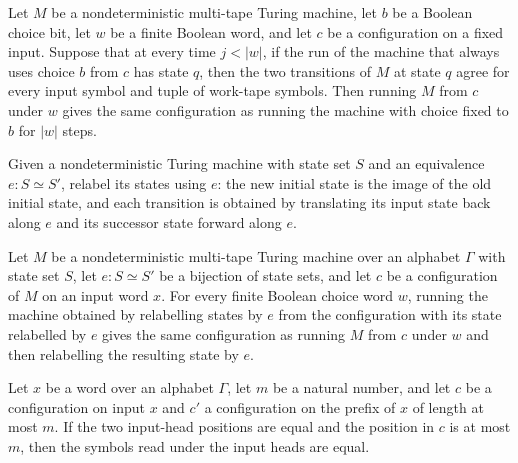 \begin{theorem}
\label{Turing.NDTM.runWith_eq_fixChoice_runFrom}
\leanok
{}
Let $M$ be a nondeterministic multi-tape Turing machine, let $b$ be a Boolean choice
bit, let $w$ be a finite Boolean word, and let $c$ be a configuration on a fixed input.
Suppose that at every time $j<|w|$, if the run of the machine that always uses choice
$b$ from $c$ has state $q$, then the two transitions of $M$ at state $q$ agree for every
input symbol and tuple of work-tape symbols. Then running $M$ from $c$ under $w$ gives
the same configuration as running the machine with choice fixed to $b$ for $|w|$ steps.
\end{theorem}

\begin{definition}
\label{Turing.NDTM.relabelState}
\leanok
{}
Given a nondeterministic Turing machine with state set $S$ and an equivalence $e:S\simeq
S'$, relabel its states using $e$: the new initial state is the image of the old initial
state, and each transition is obtained by translating its input state back along $e$ and
its successor state forward along $e$.
\end{definition}

\begin{theorem}
\label{Turing.NDTM.relabelState_runWith}
\leanok
{}
Let $M$ be a nondeterministic multi-tape Turing machine over an alphabet $\Gamma$ with
state set $S$, let $e:S\simeq S'$ be a bijection of state sets, and let $c$ be a
configuration of $M$ on an input word $x$. For every finite Boolean choice word $w$,
running the machine obtained by relabelling states by $e$ from the configuration with
its state relabelled by $e$ gives the same configuration as running $M$ from $c$ under
$w$ and then relabelling the resulting state by $e$.
\end{theorem}

\begin{lemma}
\label{Turing.NDTM.inputSymbol_take_eq}
\leanok
{}
Let $x$ be a word over an alphabet $\Gamma$, let $m$ be a natural number, and let $c$ be
a configuration on input $x$ and $c'$ a configuration on the prefix of $x$ of length at
most $m$. If the two input-head positions are equal and the position in $c$ is at most
$m$, then the symbols read under the input heads are equal.
\end{lemma}


